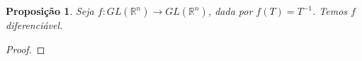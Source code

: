 \documentclass{article}
\newtheorem{prop}{Proposição}[section]
\theoremstyle{theorem}
\theoremstyle{lemma}
\theoremstyle{definition}
\theoremstyle{remark}
\begin{document}
\begin{prop}
Seja $f: GL(\mathbb{R}^n) \to GL(\mathbb{R}^n)$, dada por $f(T) = T^{-1}$.  Temos $f$ diferenciável.
\end{prop}
\begin{proof}

\end{proof}
\end{document}
